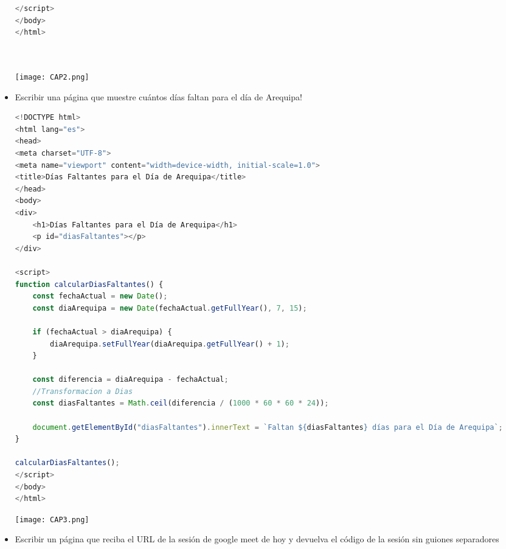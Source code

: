 \documentclass{article}
\begin{document}
\begin{itemize}
\begin{lstlisting}[language=JavaScript, caption=EJERCICIO\_02.js]
</script>
</body>
</html>
            
            
            \end{lstlisting}  


            \newline \newline \newline
            \texttt{[image: CAP2.png]}
            \newline \newline \newline

            \item Escribir una página que muestre cuántos días faltan para el día de Arequipa!

            \begin{lstlisting}[language=JavaScript, caption=EJERCICIO\_03.js]
<!DOCTYPE html>
<html lang="es">
<head>
<meta charset="UTF-8">
<meta name="viewport" content="width=device-width, initial-scale=1.0">
<title>Días Faltantes para el Día de Arequipa</title>
</head>
<body>
<div>
    <h1>Días Faltantes para el Día de Arequipa</h1>
    <p id="diasFaltantes"></p>
</div>

<script>
function calcularDiasFaltantes() {
    const fechaActual = new Date();
    const diaArequipa = new Date(fechaActual.getFullYear(), 7, 15); 
    
    if (fechaActual > diaArequipa) {
        diaArequipa.setFullYear(diaArequipa.getFullYear() + 1);
    }
    
    const diferencia = diaArequipa - fechaActual;
    //Transformacion a Dias
    const diasFaltantes = Math.ceil(diferencia / (1000 * 60 * 60 * 24));
    
    document.getElementById("diasFaltantes").innerText = `Faltan ${diasFaltantes} días para el Día de Arequipa`;
}

calcularDiasFaltantes();
</script>
</body>
</html>
            \end{lstlisting}  

            
            \newline \newline \newline
            \texttt{[image: CAP3.png]}
            \newline \newline \newline
            
            \item Escribir un página que reciba el URL de la sesión de google meet de hoy y devuelva el código de la sesión sin guiones separadores


\end{itemize}
\end{document}
